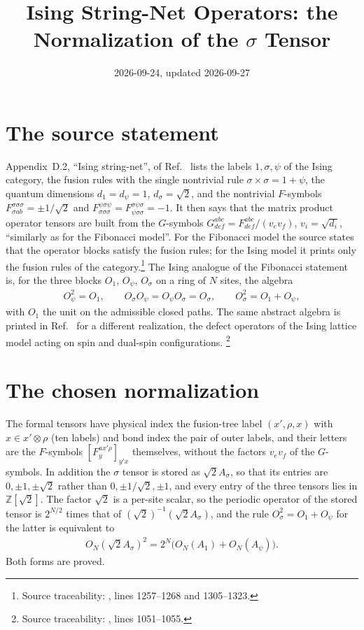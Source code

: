 \documentclass{article}
\title{Ising String-Net Operators: the Normalization of the $\sigma$ Tensor}
\author{}
\date{2026-09-24, updated 2026-09-27}
\begin{document}
\maketitle
{}

\section{The source statement}

Appendix~D.2, ``Ising string-net'', of Ref.~\cite{Bultinck2017Anyons}
lists the labels $1,\sigma,\psi$ of the Ising category, the fusion rules with
the single nontrivial rule $\sigma\times\sigma=1+\psi$, the quantum dimensions
$d_1=d_\psi=1$, $d_\sigma=\sqrt2$, and the nontrivial $F$-symbols
$F^{\sigma\sigma\sigma}_{\sigma ab}=\pm1/\sqrt2$ and
$F^{\psi\sigma\psi}_{\sigma\sigma\sigma}=F^{\sigma\psi\sigma}_{\psi\sigma\sigma}=-1$.
It then says that the matrix product operator tensors are built from the
$G$-symbols $G^{abc}_{def}=F^{abc}_{def}/(v_ev_f)$, $v_i=\sqrt{d_i}$,
``similarly as for the Fibonacci model''. For the Fibonacci model the source
states that the operator blocks satisfy the fusion rules; for the Ising model
it prints only the fusion rules of the category.\footnote{Source traceability:
    , lines 1257--1268 and
    1305--1323.}
The Ising analogue of the Fibonacci statement is, for the three blocks
$O_1$, $O_\psi$, $O_\sigma$ on a ring of $N$ sites, the algebra
\begin{align}
    O_\psi^2 = O_1,\qquad O_\sigma O_\psi = O_\psi O_\sigma = O_\sigma,\qquad
    O_\sigma^2 = O_1 + O_\psi,
    \label{eq:bmwshv17_ising_fusion_algebra}
\end{align}
with $O_1$ the unit on the admissible closed paths. The same abstract algebra
is printed in Ref.~\cite{Aasen2016IsingDefects} for a different realization,
the defect operators of the Ising lattice model acting on spin and dual-spin
configurations.%
\footnote{Source traceability:
    , lines 1051--1055.}

\section{The chosen normalization}

The formal tensors have physical index the fusion-tree label $(x',\rho,x)$
with $x\in x'\otimes\rho$ (ten labels) and bond index the pair of outer
labels, and their letters are the $F$-symbols
$[F^{a x'\rho}_y]_{y'x}$ themselves, without the factors $v_ev_f$ of the
$G$-symbols. In addition the $\sigma$ tensor is stored as $\sqrt2A_\sigma$,
so that its entries are $0,\pm1,\pm\sqrt2$ rather than
$0,\pm1/\sqrt2,\pm1$, and every entry of the three tensors lies in
$\mathbb Z[\sqrt2]$. The factor $\sqrt2$ is a per-site scalar, so the
periodic operator of the stored tensor is $2^{N/2}$ times that of
$(\sqrt2)^{-1}(\sqrt2A_\sigma)$, and the rule $O_\sigma^2=O_1+O_\psi$ for
the latter is equivalent to
\begin{align}
    O_N(\sqrt2A_\sigma)^2 = 2^N\bigl(O_N(A_1)+O_N(A_\psi)\bigr).
    \label{eq:bmwshv17_ising_scaled_rule}
\end{align}
Both forms are proved.
\end{document}
